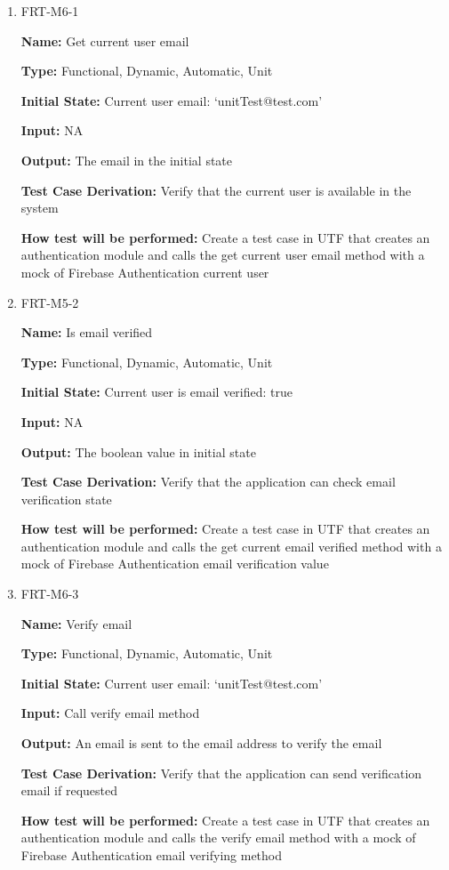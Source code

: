 \documentclass[12pt, titlepage]{article}
\begin{document}
\begin{enumerate}
\item{FRT-M6-1}

\textbf{Name:} Get current user email

\textbf{Type:} Functional, Dynamic, Automatic, Unit
					
\textbf{Initial State:} Current user email: `unitTest@test.com'
					
\textbf{Input:} NA
					
\textbf{Output:} The email in the initial state

\textbf{Test Case Derivation:} Verify that the current user is available in the system

\textbf{How test will be performed:} Create a test case in UTF that creates an authentication module and calls the get current user email method with a mock of Firebase Authentication current user

\item{FRT-M5-2}

\textbf{Name:} Is email verified

\textbf{Type:} Functional, Dynamic, Automatic, Unit
					
\textbf{Initial State:} Current user is email verified: true
					
\textbf{Input:} NA
					
\textbf{Output:} The boolean value in initial state

\textbf{Test Case Derivation:} Verify that the application can check email verification state

\textbf{How test will be performed:} Create a test case in UTF that creates an authentication module and calls the get current email verified method with a mock of Firebase Authentication email verification value

\item{FRT-M6-3}

\textbf{Name:} Verify email

\textbf{Type:} Functional, Dynamic, Automatic, Unit
					
\textbf{Initial State:} Current user email: `unitTest@test.com'
					
\textbf{Input:} Call verify email method
					
\textbf{Output:} An email is sent to the email address to verify the email

\textbf{Test Case Derivation:} Verify that the application can send verification email if requested

\textbf{How test will be performed:} Create a test case in UTF that creates an authentication module and calls the verify email method with a mock of Firebase Authentication email verifying method
\end{enumerate}
\end{document}
